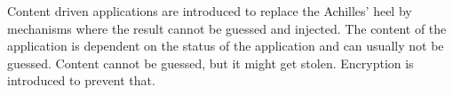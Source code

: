 Content driven applications are introduced to replace the Achilles' heel by mechanisms where the result cannot be guessed and injected. The content of the application is dependent on the status of the application and can usually not be guessed.
\newline
Content cannot be guessed, but it might get stolen. Encryption is introduced to prevent that.
